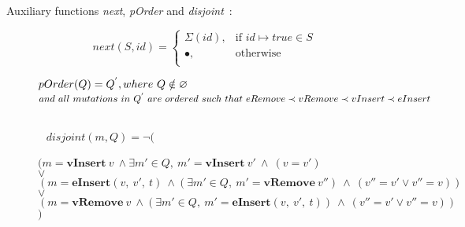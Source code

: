 \begin{frame}
Auxiliary functions \emph{next}, \emph{pOrder} and \emph{disjoint}~:
\begin{tiny}
\begin{figure}
\begin{center}
\[
    next(S, id)= 
\begin{cases}
    \Sigma(id), & \text{if } id \mapsto true \in S\\
    \bullet,              & \text{otherwise}\\
\end{cases}
\]

$\begin{array}{@{}l@{~}l@{\quad}l@{\!\!\!\!\!\!}r}
 pOrder(Q) = Q^{'}, where~Q \notin \varnothing
\end{array}
$
$\begin{array}{@{}l@{~}l@{\quad}l@{\!\!\!\!\!\!}r}
and~all~mutations~in~Q^{'}~are~ordered~such~that~eRemove \prec vRemove \prec vInsert \prec eInsert\\ 
\end{array}
$

$\begin{array}{@{}l@{~}l@{\quad}l@{\!\!\!\!\!\!}r}
\\
\\
\\
\end{array}
$
$disjoint(m, Q) = \neg($\\
$(m = \textbf{vInsert}~v~\wedge \exists m' \in Q,~m' = \textbf{vInsert}~v'~\wedge~(v=v')$\\
$\vee $\\
$(m = \textbf{eInsert} (v,~v',~t)~\wedge (\exists m' \in Q,~m' = \textbf{vRemove}~v'')~\wedge~(v''=v'\vee v'' = v))$\\
$\vee $\\
$(m = \textbf{vRemove}~v~\wedge (\exists m' \in Q,~m' = \textbf{eInsert} (v,~v',~t))~\wedge~(v''=v'\vee v'' = v))$\\
$)$


\end{center}
\label{fig-auxFunc}
\end{figure}
\end{tiny}
\end{frame}

